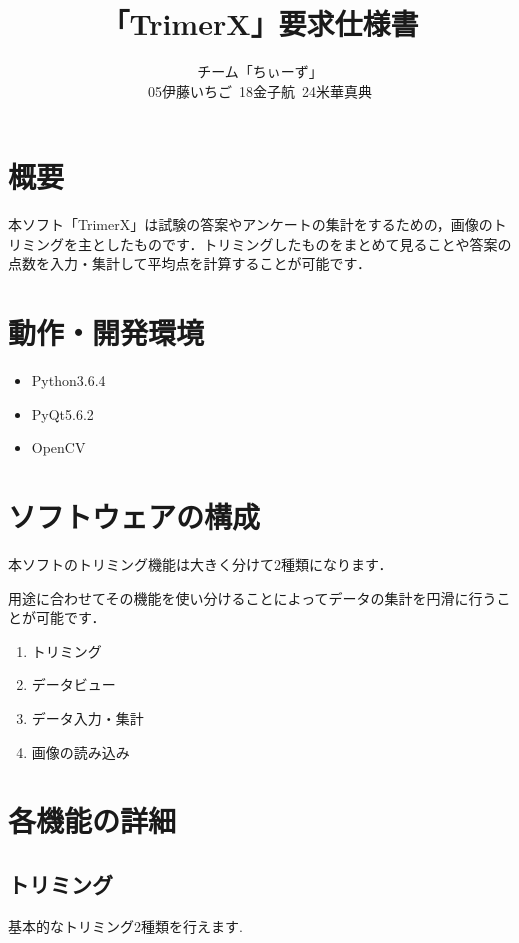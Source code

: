 \documentclass[12pt]{jsarticle}
\title{「TrimerX」要求仕様書}
\author{チーム「ちぃーず」\\05伊藤いちご\ 18金子航\ 24米華真典}
\date{}
\begin{document}
\maketitle
\newpage

\tableofcontents

\newpage

\setcounter{page}{1}

\section{概要}
本ソフト「TrimerX」は試験の答案やアンケートの集計をするための，画像のトリミングを主としたものです．トリミングしたものをまとめて見ることや答案の点数を入力・集計して平均点を計算することが可能です．

\newpage

\section{動作・開発環境}
\begin{itemize}
    \item Python3.6.4
    \item PyQt5.6.2
    \item OpenCV
\end{itemize}

\newpage


\section{ソフトウェアの構成}
本ソフトのトリミング機能は大きく分けて2種類になります．

用途に合わせてその機能を使い分けることによってデータの集計を円滑に行うことが可能です．
\begin{enumerate}
    \item トリミング
    \item データビュー
    \item データ入力・集計
    \item 画像の読み込み
\end{enumerate}

\newpage

\section{各機能の詳細}

\subsection{トリミング}
基本的なトリミング2種類を行えます.
\end{document}

